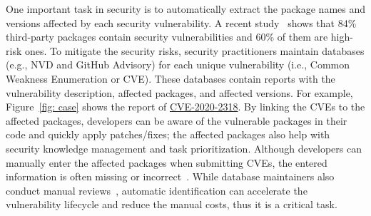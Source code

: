 One important task in security is to automatically extract the package names and versions affected by each security vulnerability. 
A recent study~\cite{wang2020empirical} shows that 84\% third-party packages contain security vulnerabilities and 60\% of them are high-risk ones.
To mitigate the security risks, security practitioners maintain databases (e.g., NVD and GitHub Advisory) for each unique vulnerability (i.e., Common Weakness Enumeration or CVE). These databases contain reports with the vulnerability description, affected packages, and affected versions. For example, Figure~\ref{fig: case} shows the report of \href{https://github.com/advisories/GHSA-485q-v457-3p58}{CVE-2020-2318}. By linking the CVEs to the affected packages, developers can be aware of the vulnerable packages in their code and quickly apply patches/fixes; the affected packages also help with security knowledge management and task prioritization. Although developers can manually enter the affected packages when submitting CVEs, the entered information is often missing or incorrect~\cite{lightxml,viem}. While database maintainers also conduct manual reviews~\cite{githubReview}, automatic identification can accelerate the vulnerability lifecycle and reduce the manual costs, thus it is a critical task. 

